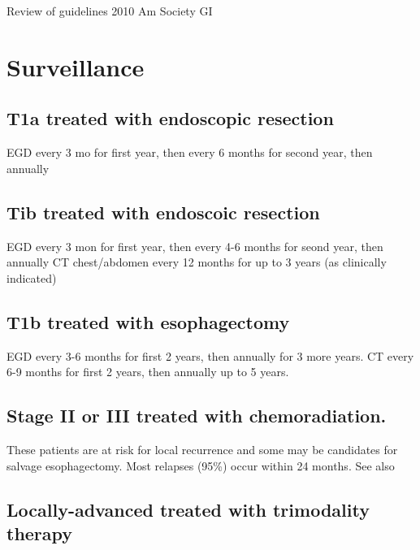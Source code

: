 \documentclass[
]{book}
\begin{document}
Review of guidelines 2010 Am Society GI \citep{sharma258}

\hypertarget{eso_surveillance}{%
\chapter{Surveillance}\label{eso_surveillance}}

\hypertarget{t1a-treated-with-endoscopic-resection}{%
\section{T1a treated with endoscopic resection}\label{t1a-treated-with-endoscopic-resection}}

EGD every 3 mo for first year, then every 6 months for second year, then annually\citep{shaheen30}

\hypertarget{tib-treated-with-endoscoic-resection}{%
\section{Tib treated with endoscoic resection}\label{tib-treated-with-endoscoic-resection}}

EGD every 3 mon for first year, then every 4-6 months for seond year, then annually
CT chest/abdomen every 12 months for up to 3 years (as clinically indicated)

\hypertarget{t1b-treated-with-esophagectomy}{%
\section{T1b treated with esophagectomy}\label{t1b-treated-with-esophagectomy}}

EGD every 3-6 months for first 2 years, then annually for 3 more years.
CT every 6-9 months for first 2 years, then annually up to 5 years.

\hypertarget{stage-ii-or-iii-treated-with-chemoradiation.}{%
\section{Stage II or III treated with chemoradiation.}\label{stage-ii-or-iii-treated-with-chemoradiation.}}

These patients are at risk for local recurrence \citep{sudo3400} and some may be candidates for salvage esophagectomy. Most relapses (95\%) occur within 24 months. See also \citep{taketa1139}

\hypertarget{locally-advanced-treated-with-trimodality-therapy}{%
\section{Locally-advanced treated with trimodality therapy}\label{locally-advanced-treated-with-trimodality-therapy}}
\end{document}
